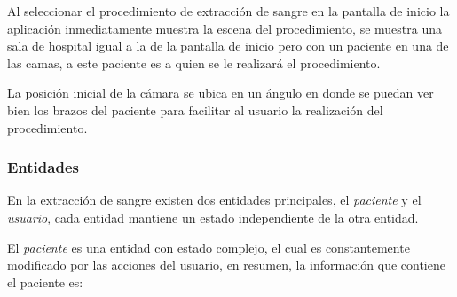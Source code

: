 Al seleccionar el procedimiento de extracción de sangre en la pantalla de inicio 
la aplicación inmediatamente muestra la escena del procedimiento, se muestra una 
sala de hospital igual a la de la pantalla de inicio pero con un paciente en una 
de las camas, a este paciente es a quien se le realizará el procedimiento.

La posición inicial de la cámara se ubica en un ángulo en donde se puedan ver 
bien los brazos del paciente para facilitar al usuario la realización del 
procedimiento.


\subsubsection{Entidades}


En la extracción de sangre existen dos entidades principales, el \emph{paciente}
y el \emph{usuario}, cada entidad mantiene un estado independiente de la otra
entidad.

El \emph{paciente} es una entidad con estado complejo, el cual es constantemente
modificado por las acciones del usuario, en resumen, la información que contiene
el paciente es:

